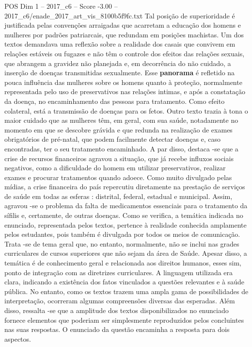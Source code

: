 \begin{textsample}{POS Dim 1 – 2017\_c6 – Score -3.00 – 2017\_c6/enade\_2017\_art\_vis\_8100b5f9fc.txt}
Tal posição de superioridade é justificada pelas convenções arraigadas que acarretam a educação dos homens e mulheres por padrões patriarcais, que redundam em posições machistas.
Um dos textos demandava uma reflexão sobre a realidade dos casais que convivem em relações estáveis ou fugazes e não têm o controle dos efeitos das relações sexuais, que abrangem a gravidez não planejada e, em decorrência do não cuidado, a inserção de doenças transmitidas sexualmente.
Esse \textbf{panorama} é refletido na pouca influência das mulheres sobre os homens quanto à proteção, normalmente representada pelo uso de preservativos nas relações intimas, e após a constatação da doença, no encaminhamento das pessoas para tratamento.
Como efeito colateral, está a transmissão de doenças para os fetos.
Outro texto trazia à tona o maior cuidado que as mulheres têm, em geral, com sua saúde, notadamente no momento em que se descobre grávida e que redunda na realização de exames obrigatórios de pré-natal, que podem facilmente detectar doenças e, caso encontradas, ter o seu tratamento encaminhado.
A par disso, destaca -se que a crise de recursos financeiros agravou a situação, que já recebe influxos sociais negativos, como a dificuldade do homem em utilizar preservativos, realizar exames e procurar tratamentos quando adoece.
Como muito divulgado pelas mídias, a crise financeira do país repercutiu diretamente na prestação de serviços de saúde em todas as esferas : distrital, federal, estadual e municipal.
Assim, agravou -se o problema da falta de medicamentos essenciais para o tratamento da sífilis e, certamente, de outras doenças.
Como se verifica, a temática indicada no enunciado, representada pelos textos, pertence à realidade conhecida amplamente pelos estudantes, pois também é divulgada por todos os meios de comunicação.
Trata -se de tema geral que, no entanto, normalmente, não se inclui nas grades curriculares de cursos superiores que não sejam da área de Saúde.
Apesar disso, a temática é de conhecimento geral e relacionada aos direitos humanos, esses sim, ponto de integração com as diretrizes curriculares.
A linguagem utilizada era clara, indicando a existência dos fatos vinculados a questões relevantes e à saúde pública.
No entanto, como os textos trazem uma ampla gama de possibilidades de interpretação, ocorreram algumas compreensões diversas das esperadas.
Além disso, ressalta -se que a amplitude dos textos disponibilizados no enunciado fornece elementos que poderiam ser simplesmente reproduzidos pelos concluintes nas suas respostas.
O enunciado da questão encaminha a resposta para dois aspectos.

\end{textsample}

